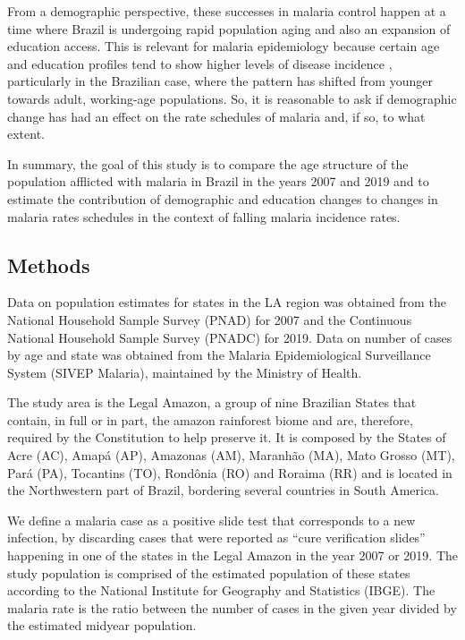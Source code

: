 \documentclass[
  12pt,
]{article}
\begin{document}
From a demographic perspective, these successes in malaria control happen at a time where Brazil is undergoing rapid population aging \citep{camaranoPopulacaoBrasileiraSeus2014} and also an expansion of education access. This is relevant for malaria epidemiology because certain age and education profiles tend to show higher levels of disease incidence \citep{bezerraChangesMalariaPatterns2020, corderStatisticalModelingSurveillance2019}, particularly in the Brazilian case, where the pattern has shifted from younger towards adult, working-age populations. So, it is reasonable to ask if demographic change has had an effect on the rate schedules of malaria and, if so, to what extent.

In summary, the goal of this study is to compare the age structure of the population afflicted with malaria in Brazil in the years 2007 and 2019 and to estimate the contribution of demographic and education changes to changes in malaria rates schedules in the context of falling malaria incidence rates.

\hypertarget{methods}{%
\subsection{Methods}\label{methods}}

Data on population estimates for states in the LA region was obtained from the National Household Sample Survey (PNAD) for 2007 and the Continuous National Household Sample Survey (PNADC) for 2019. Data on number of cases by age and state was obtained from the Malaria Epidemiological Surveillance System (SIVEP Malaria), maintained by the Ministry of Health.

The study area is the Legal Amazon, a group of nine Brazilian States that contain, in full or in part, the amazon rainforest biome and are, therefore, required by the Constitution to help preserve it. It is composed by the States of Acre (AC), Amapá (AP), Amazonas (AM), Maranhão (MA), Mato Grosso (MT), Pará (PA), Tocantins (TO), Rondônia (RO) and Roraima (RR) and is located in the Northwestern part of Brazil, bordering several countries in South America.

We define a malaria case as a positive slide test that corresponds to a new infection, by discarding cases that were reported as ``cure verification slides'' happening in one of the states in the Legal Amazon in the year 2007 or 2019. The study population is comprised of the estimated population of these states according to the National Institute for Geography and Statistics (IBGE). The malaria rate is the ratio between the number of cases in the given year divided by the estimated midyear population.
\end{document}
